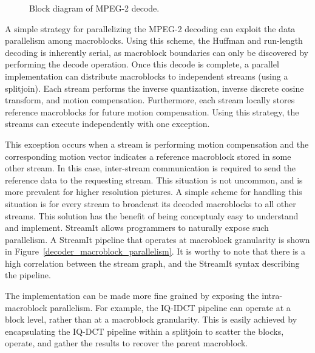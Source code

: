 \begin{figure}[htbp]
\centerline{}
\caption{Block diagram of MPEG-2 decode.}
\label{fig:dec_block}
\end{figure}

A simple strategy for parallelizing the MPEG-2 decoding can exploit
the data parallelism among macroblocks. Using this scheme, the Huffman
and run-length decoding is inherently serial, as macroblock boundaries
can only be discovered by performing the decode operation.  Once this
decode is complete, a parallel implementation can distribute
macroblocks to independent streams (using a splitjoin). Each stream
performs the inverse quantization, inverse discrete cosine transform,
and motion compensation. Furthermore, each stream locally stores
reference macroblocks for future motion compensation. Using this
strategy, the streams can execute independently with one exception.

\begin{figure*}[t]
\caption{An MPEG-2 Decoder exploiting macroblock parallelism.}
\label{decoder_macroblock_parallelism}
\end{figure*}

This exception occurs when a stream is performing motion compensation
and the corresponding motion vector indicates a reference macroblock
stored in some other stream. In this case, inter-stream communication
is required to send the reference data to the requesting stream. This
situation is not uncommon, and is more prevalent for higher resolution
pictures. A simple scheme for handling this situation is for every
stream to broadcast its decoded macroblocks to all other streams. This
solution has the benefit of being conceptualy easy to understand and
implement. StreamIt allows programmers to naturally expose such
parallelism. A StreamIt pipeline that operates at macroblock
granularity is shown in Figure~\ref{decoder_macroblock_parallelism}. It is
worthy to note that there is a high correlation between the stream
graph, and the StreamIt syntax describing the pipeline.

The implementation can be made more fine grained by exposing the
intra-macroblock parallelism. For example, the IQ-IDCT pipeline can
operate at a block level, rather than at a macroblock
granularity. This is easily achieved by encapsulating the IQ-DCT pipeline
within a splitjoin to scatter the blocks, operate, and gather the
results to recover the parent macroblock.

